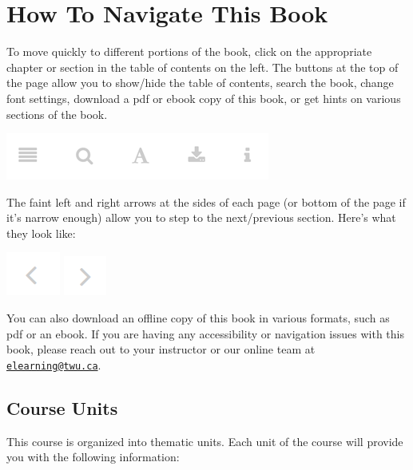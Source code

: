 \documentclass[
]{book}
\begin{document}
\hypertarget{how-to-navigate-this-book}{%
\section*{How To Navigate This Book}\label{how-to-navigate-this-book}}

To move quickly to different portions of the book, click on the appropriate chapter or section in the table of contents on the left. The buttons at the top of the page allow you to show/hide the table of contents, search the book, change font settings, download a pdf or ebook copy of this book, or get hints on various sections of the book.

\includegraphics{assets/course-intro/menu.png}

The faint left and right arrows at the sides of each page (or bottom of the page if it's narrow enough) allow you to step to the next/previous section. Here's what they look like:

\includegraphics{assets/course-intro/left_arrow.png} \includegraphics{assets/course-intro/right_arrow.png}

You can also download an offline copy of this book in various formats, such as pdf or an ebook. If you are having any accessibility or navigation issues with this book, please reach out to your instructor or our online team at \href{mailto:elearning@twu.ca}{\nolinkurl{elearning@twu.ca}}.

\hypertarget{course-units}{%
\subsection*{Course Units}\label{course-units}}

This course is organized into thematic units. Each unit of the course will provide you with the following information:
\end{document}
